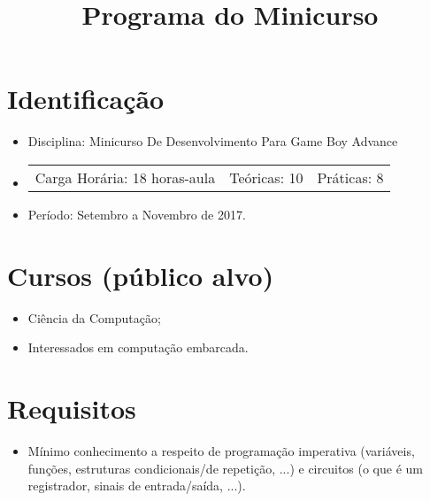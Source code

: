 \documentclass{article}
\title{Programa do Minicurso}
\author{}
\date{}
\begin{document}
\maketitle

\section{Identificação}

\begin{itemize}
    \item[] Disciplina: Minicurso De Desenvolvimento Para Game Boy Advance
    \item[]
        \hspace{-1em}
        \begin{tabular}{ccc}
            Carga Horária: 18 horas-aula&
            Teóricas: 10&
            Práticas: 8
        \end{tabular}
    \item[] Período: Setembro a Novembro de
                     2017.
\end{itemize}

\section{Cursos (público alvo)}
\begin{itemize}
    \item[] Ciência da Computação;
    \item[] Interessados em computação embarcada.
\end{itemize}

\section{Requisitos}
\begin{itemize}
    \item[] Mínimo conhecimento a respeito de programação imperativa (variáveis, funções, estruturas condicionais/de repetição, ...) e circuitos (o que é um registrador, sinais de entrada/saída, ...).
\end{itemize}
\end{document}
